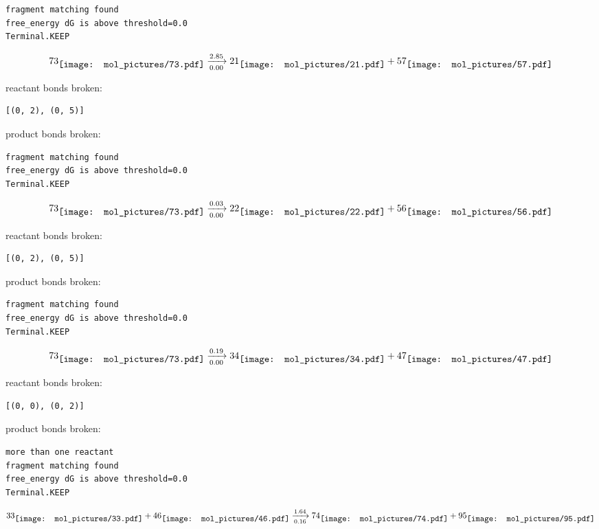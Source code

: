 \documentclass{article}
\begin{document}
\vspace{1cm}
\begin{verbatim}
fragment matching found
free_energy dG is above threshold=0.0
Terminal.KEEP
\end{verbatim}
$$
73
\raisebox{-.5\height}{\texttt{[image: mol\_pictures/73.pdf]}}
\xrightarrow[0.00]{2.85}
21
\raisebox{-.5\height}{\texttt{[image: mol\_pictures/21.pdf]}}
+
57
\raisebox{-.5\height}{\texttt{[image: mol\_pictures/57.pdf]}}
$$


reactant bonds broken:\begin{verbatim}
[(0, 2), (0, 5)]
\end{verbatim}
product bonds broken:



\vspace{1cm}
\begin{verbatim}
fragment matching found
free_energy dG is above threshold=0.0
Terminal.KEEP
\end{verbatim}
$$
73
\raisebox{-.5\height}{\texttt{[image: mol\_pictures/73.pdf]}}
\xrightarrow[0.00]{0.03}
22
\raisebox{-.5\height}{\texttt{[image: mol\_pictures/22.pdf]}}
+
56
\raisebox{-.5\height}{\texttt{[image: mol\_pictures/56.pdf]}}
$$


reactant bonds broken:\begin{verbatim}
[(0, 2), (0, 5)]
\end{verbatim}
product bonds broken:



\vspace{1cm}
\begin{verbatim}
fragment matching found
free_energy dG is above threshold=0.0
Terminal.KEEP
\end{verbatim}
$$
73
\raisebox{-.5\height}{\texttt{[image: mol\_pictures/73.pdf]}}
\xrightarrow[0.00]{0.19}
34
\raisebox{-.5\height}{\texttt{[image: mol\_pictures/34.pdf]}}
+
47
\raisebox{-.5\height}{\texttt{[image: mol\_pictures/47.pdf]}}
$$


reactant bonds broken:\begin{verbatim}
[(0, 0), (0, 2)]
\end{verbatim}
product bonds broken:



\vspace{1cm}
\begin{verbatim}
more than one reactant
fragment matching found
free_energy dG is above threshold=0.0
Terminal.KEEP
\end{verbatim}
$$
33
\raisebox{-.5\height}{\texttt{[image: mol\_pictures/33.pdf]}}
+
46
\raisebox{-.5\height}{\texttt{[image: mol\_pictures/46.pdf]}}
\xrightarrow[0.16]{1.64}
74
\raisebox{-.5\height}{\texttt{[image: mol\_pictures/74.pdf]}}
+
95
\raisebox{-.5\height}{\texttt{[image: mol\_pictures/95.pdf]}}
$$
\end{document}
